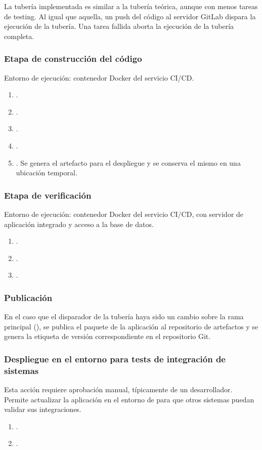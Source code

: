 La tubería implementada es similar a la tubería teórica, aunque con
menos tareas de testing. Al igual que aquella, un push del código al
servidor GitLab dispara la ejecución de la tubería. Una tarea fallida
aborta la ejecución de la tubería completa.
%
\subsubsection{Etapa de construcción del código}
%
Entorno de ejecución: contenedor Docker del servicio CI/CD.
%
\begin{enumerate}
\item {}.
\item {}.
\item {}.
\item {}.
\item {}. Se genera el artefacto para
  el despliegue y se conserva el mismo en una ubicación temporal.
\end{enumerate}
%
\subsubsection{Etapa de verificación}
%
Entorno de ejecución: contenedor Docker del servicio CI/CD, con
servidor de aplicación integrado y acceso a la base de datos.
%
\begin{enumerate}
\item {}.
\item {}.
\item {}.
\end{enumerate}
%
\subsubsection{Publicación}
%
En el caso que el disparador de la tubería haya sido un cambio sobre
la rama principal (), se publica el paquete de la
aplicación al repositorio de artefactos y se genera la etiqueta de
versión correspondiente en el repositorio Git.
%
\subsubsection{Despliegue en el entorno para tests de integración de sistemas}

Esta acción requiere aprobación manual, típicamente de un
desarrollador. Permite actualizar la aplicación en el entorno de
 para que otros sistemas puedan validar sus
integraciones.
%
\begin{enumerate}
\item {}.
\item {}.
\end{enumerate}
%
